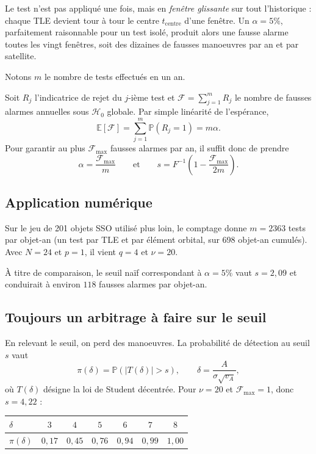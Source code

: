 \documentclass{article}
\theoremstyle{remark}
\begin{document}
Le test n'est pas appliqué une fois, mais en \emph{fenêtre glissante} sur tout l'historique :
chaque TLE devient tour à tour le centre $t_{\mathrm{centre}}$ d'une fenêtre. Un $\alpha = 5\%$,
parfaitement raisonnable pour un test isolé, produit alors une fausse alarme toutes les vingt
fenêtres, soit des dizaines de fausses manoeuvres par an et par satellite.

Notons $m$ le nombre de tests effectués en un an.

Soit $R_j$ l'indicatrice de rejet du $j$-ième test et $\mathcal{F} = \sum_{j=1}^{m} R_j$ le
nombre de fausses alarmes annuelles sous $\mathcal{H}_0$ globale. Par simple linéarité de
l'espérance,
\[
\mathbb{E}[\mathcal{F}] = \sum_{j=1}^{m} \mathbb{P}(R_j = 1) = m \alpha .
\]
Pour garantir au plus $\mathcal{F}_{\mathrm{max}}$ fausses alarmes par an, il suffit donc de prendre
\[
\boxed{\ \alpha = \frac{\mathcal{F}_{\mathrm{max}}}{m}
\qquad \text{et} \qquad
s = F^{-1}\left( 1 - \frac{\mathcal{F}_{\mathrm{max}}}{2m} \right) . \ }
\]
\subsection*{Application numérique}

Sur le jeu de 201 objets SSO utilisé plus loin, le comptage donne $m = 2363$ tests par
objet-an (un test par TLE et par élément orbital, sur 698 objet-an cumulés). Avec $N = 24$ et
$p = 1$, il vient $q = 4$ et $\nu = 20$.

\begin{center}

\end{center}

\noindent
À titre de comparaison, le seuil naïf correspondant à $\alpha = 5\%$ vaut $s = 2{,}09$ et
conduirait à environ $118$ fausses alarmes par objet-an.

\subsection*{Toujours un arbitrage à faire sur le seuil}

En relevant le seuil, on perd des manoeuvres. La probabilité de détection au seuil $s$ vaut
\[
\pi(\delta) = \mathbb{P}\left( |T(\delta)| > s \right), \qquad \delta = \frac{A}{\sigma\sqrt{v_A}} ,
\]
où $T(\delta)$ désigne la loi de Student décentrée. Pour $\nu = 20$ et
$\mathcal{F}_{\mathrm{max}} = 1$, donc $s = 4{,}22$ :

\begin{center}
\begin{tabular}{lcccccc}
\toprule
$\delta$ & $3$ & $4$ & $5$ & $6$ & $7$ & $8$ \\
\midrule
$\pi(\delta)$ & $0{,}17$ & $0{,}45$ & $0{,}76$ & $0{,}94$ & $0{,}99$ & $1{,}00$ \\
\bottomrule
\end{tabular}
\end{center}
\end{document}
